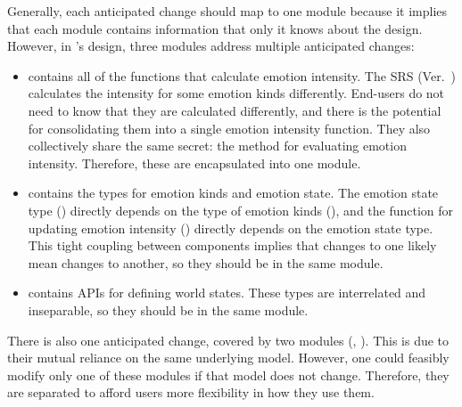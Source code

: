 Generally, each anticipated change should map to one module because it implies
that each module contains information that only it knows about the design.
However, in \progname{}'s design, three modules address multiple anticipated
changes:
\begin{itemize}

    \item {} contains all of the functions that calculate
    emotion intensity. The SRS (Ver.~\srsVersion) calculates the intensity for
    some emotion kinds differently. End-users do not need to know that they are
    calculated differently, and there is the potential for consolidating them
    into a single emotion intensity function. They also collectively share the
    same secret: the method for evaluating emotion intensity. Therefore, these
    are encapsulated into one module.

    \item {} contains the types for emotion kinds and emotion
    state. The emotion state type () directly depends
    on the type of emotion kinds (), and the function
    for updating emotion intensity () directly
    depends on the emotion state type. This tight coupling between components
    implies that changes to one likely mean changes to another, so they should
    be in the same module.

    \item {} contains APIs for defining world states. These types
    are interrelated and inseparable, so they should be in the same module.

\end{itemize}

There is also one anticipated change,  covered by
two modules (, ). This is due to their mutual
reliance on the same underlying model. However, one could feasibly modify only
one of these modules if that model does not change. Therefore, they are
separated to afford users more flexibility in how they use them.
